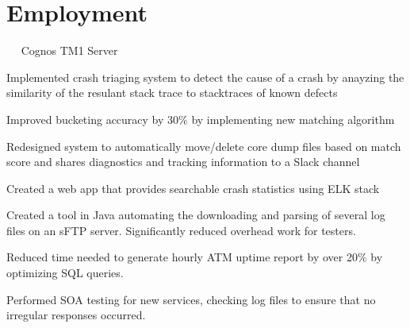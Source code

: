 \documentclass[]{deedy-resume-openfont}
\begin{document}
\hfill
\begin{minipage}[t]{0.66\textwidth} 


\section{Employment}

~~ Cognos TM1 Server
\vspace{\topsep} %
\begin{tightemize}
\item Implemented crash triaging system to detect the cause of a crash by anayzing the similarity of the resulant stack trace to stacktraces of known defects
\item Improved bucketing accuracy by 30\% by implementing new matching algorithm
\item Redesigned system to automatically move/delete core dump files based on match score and shares diagnostics and tracking information to a Slack channel
\item Created a web app that provides searchable crash statistics using ELK stack
\end{tightemize}
\sectionsep

\begin{tightemize}
\item Created a tool in Java automating the downloading and parsing of several log files on an sFTP server. Significantly reduced overhead work for testers. %
\item Reduced time needed to generate hourly ATM uptime report by over 20\% by optimizing SQL queries.   
\item Performed SOA testing for new services, checking log files to ensure that no irregular responses occurred.
\end{tightemize}
\sectionsep


\end{minipage}
\end{document}
